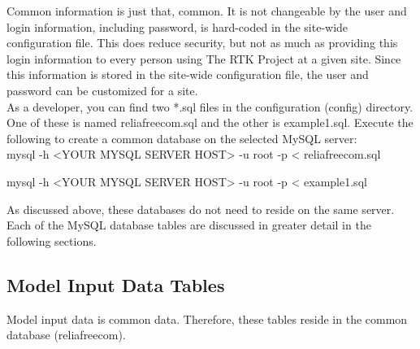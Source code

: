 \documentclass[11pt, 12pt, twoside, onecolumn]{article}
\begin{document}
\noindent Common information is just that, common.  It is not changeable by the user and login information, including password, is hard-coded in the site-wide configuration file.  This does reduce security, but not as much as providing this login information to every person using The RTK Project at a given site.  Since this information is stored in the site-wide configuration file, the user and password can be customized for a site. \\

\noindent As a developer, you can find two *.sql files in the configuration (config) directory.  One of these is named reliafreecom.sql and the other is example1.sql.  Execute the following to create a common database on the selected MySQL server: \\

    mysql -h <YOUR MYSQL SERVER HOST> -u root -p < reliafreecom.sql

    mysql -h <YOUR MYSQL SERVER HOST> -u root -p < example1.sql

\bigskip \noindent As discussed above, these databases do not need to reside on the same server.  Each of the MySQL database tables are discussed in greater detail in the following sections.

\subsection{\bf \large Model Input Data Tables}

\noindent Model input data is common data.  Therefore, these tables reside in the common database (reliafreecom). \\
\end{document}
